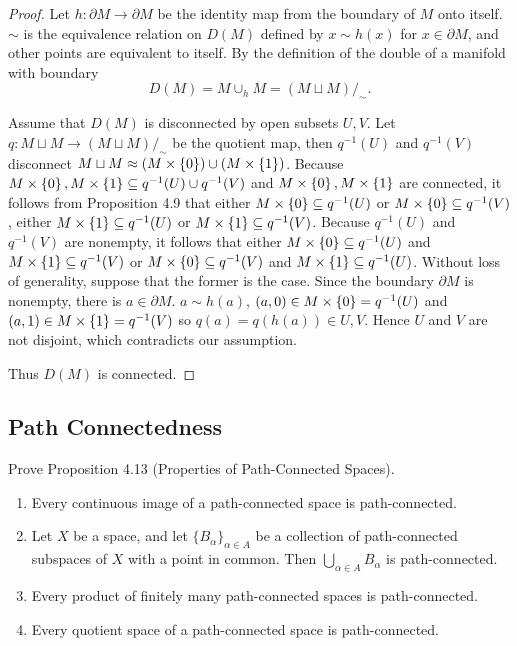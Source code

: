\begin{proof}
	Let $h: \partial M\to \partial M$ be the identity map from the boundary of $M$ onto itself. $\sim$ is the equivalence relation on $D(M)$ defined by $x\sim h(x)$ for $x\in\partial M$, and other points are equivalent to itself. By the definition of the double of a manifold with boundary
	\begin{equation*}
		D(M) = M\cup_{h}M = (M\sqcup M)/_{\sim}.
	\end{equation*}

	Assume that $D(M)$ is disconnected by open subsets $U, V$. Let $q: M \sqcup M \to (M \sqcup M)/_{\sim}$ be the quotient map, then $q^{-1}(U)$ and $q^{-1}(V)$ disconnect $M\sqcup M \approx (M\times\left\{{0}\right\}) \cup (M\times\left\{{1}\right\})$. Because $M\times\left\{{0}\right\}, M\times\left\{{1}\right\} \subseteq q^{-1}(U) \cup q^{-1}(V)$ and $M\times\left\{{0}\right\}, M\times\left\{{1}\right\}$ are connected, it follows from Proposition 4.9 that either $M\times\left\{{0}\right\} \subseteq q^{-1}(U)$ or $M\times\left\{{0}\right\} \subseteq q^{-1}(V)$, either $M\times\left\{{1}\right\} \subseteq q^{-1}(U)$ or $M\times\left\{{1}\right\} \subseteq q^{-1}(V)$. Because $q^{-1}(U)$ and $q^{-1}(V)$ are nonempty, it follows that either $M\times\left\{{0}\right\} \subseteq q^{-1}(U)$ and $M\times\left\{{1}\right\} \subseteq q^{-1}(V)$ or $M\times\left\{{0}\right\} \subseteq q^{-1}(V)$ and $M\times\left\{{1}\right\} \subseteq q^{-1}(U)$. Without loss of generality, suppose that the former is the case. Since the boundary $\partial M$ is nonempty, there is $a \in \partial M$. $a \sim h(a)$, $(a, 0) \in M\times\left\{{0}\right\} = q^{-1}(U)$ and $(a, 1) \in M\times\left\{{1}\right\} = q^{-1}(V)$ so $q(a) = q(h(a)) \in U, V$. Hence $U$ and $V$ are not disjoint, which contradicts our assumption.

	Thus $D(M)$ is connected.
\end{proof}

\subsection*{Path Connectedness}

\begin{exercise}{4.14}\label{exercise:4.14}
	Prove Proposition 4.13 (Properties of Path-Connected Spaces).
	\begin{enumerate}[label={(\alph*)}]
		\item Every continuous image of a path-connected space is path-connected.
		\item Let $X$ be a space, and let ${\{ B_{\alpha} \}}_{\alpha\in A}$ be a collection of path-connected subspaces of $X$ with a point in common. Then $\bigcup_{\alpha\in A}B_{\alpha}$ is path-connected.
		\item Every product of finitely many path-connected spaces is path-connected.
		\item Every quotient space of a path-connected space is path-connected.
	\end{enumerate}
\end{exercise}

